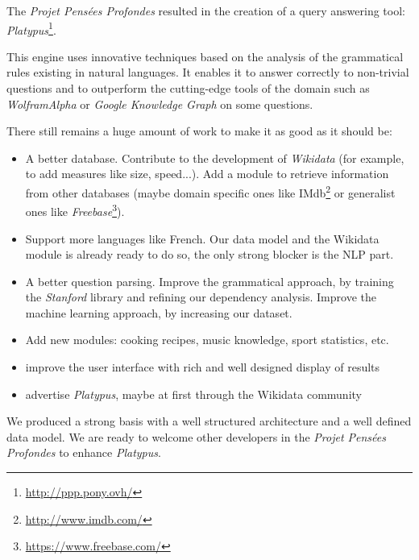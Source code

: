 The \emph{Projet Pensées Profondes} resulted in the creation of a query answering tool: \emph{Platypus}\footnote{\url{http://ppp.pony.ovh/}}.

This engine uses innovative techniques based on the analysis of the grammatical rules existing in natural languages. It enables it to answer correctly to non-trivial questions and to outperform the cutting-edge tools of the domain such as \emph{WolframAlpha} or \emph{Google Knowledge Graph} on some questions.

There still remains a huge amount of work to make it as good as it should be:
\begin{itemize}
    \item A better database. Contribute to the development of \emph{Wikidata} (for example, to add measures like size, speed...). Add a module to retrieve information from other databases (maybe domain specific ones like IMdb\footnote{\url{http://www.imdb.com/}} or generalist ones like \emph{Freebase}\footnote{\url{https://www.freebase.com/}}).
    \item Support more languages like French. Our data model and the Wikidata module is already ready to do so, the only strong blocker is the NLP part.
    \item A better question parsing. Improve the grammatical approach, by training the \emph{Stanford} library and refining our dependency analysis. Improve the machine learning approach, by increasing our dataset.
    \item Add new modules: cooking recipes, music knowledge, sport statistics, etc.
    \item improve the user interface with rich and well designed display of results
    \item advertise \emph{Platypus}, maybe at first through the Wikidata community
\end{itemize}

We produced a strong basis with a well structured architecture and a well defined data model. We are ready to welcome other developers in the \emph{Projet Pensées Profondes} to enhance \emph{Platypus}.
